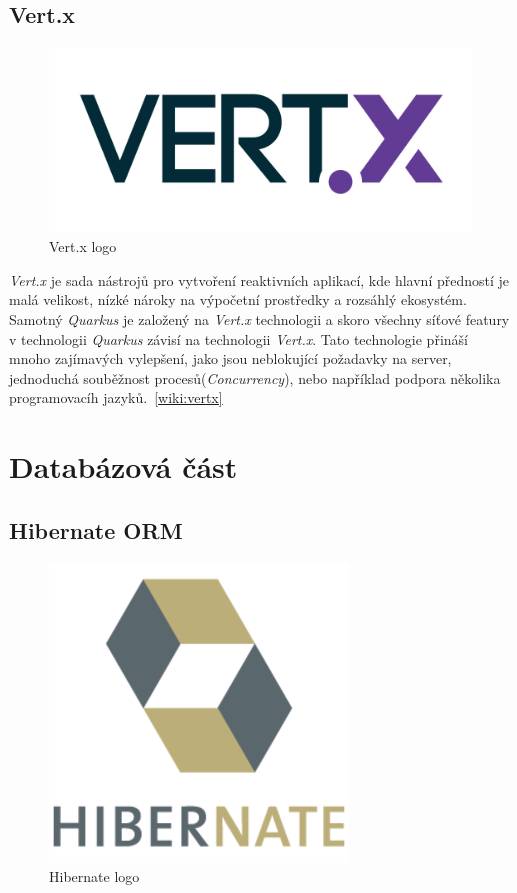 \newpage
\subsection*{Vert.x}
\label{pouzite:vertx}
\begin{figure}[hbt]
  \centering
  \includegraphics[width=.30 \linewidth]{obrazky-figures/vertx.png}
  \caption{Vert.x logo}
\end{figure}

\emph{Vert.x} je sada nástrojů pro vytvoření reaktivních aplikací, kde hlavní předností je malá velikost, nízké nároky na výpočetní prostředky a rozsáhlý ekosystém.
Samotný \emph{Quarkus} je založený na \emph{Vert.x} technologii a skoro všechny síťové featury v technologii \emph{Quarkus} závisí na technologii \emph{Vert.x}.
Tato technologie přináší mnoho zajímavých vylepšení, jako jsou neblokující požadavky na server, jednoduchá souběžnost procesů(\emph{Concurrency}), nebo například podpora několika programovacíh jazyků.~\ref{wiki:vertx}

\section{Databázová část}
\label{pouzite:db}

\subsection*{Hibernate ORM}
\label{app_prostredi:hibernate}
\begin{figure}[hbt]
  \centering
  \includegraphics[width=.2 \linewidth]{obrazky-figures/hibernate.png}
  \caption{Hibernate logo}
\end{figure}

